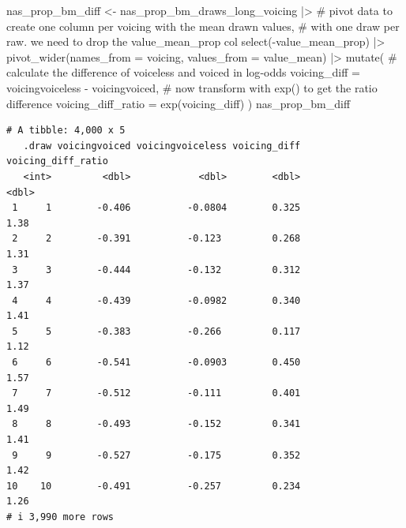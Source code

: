 \documentclass[
  authoryear,
  preprint,
  3p]{elsarticle}
\newenvironment{Shaded}{\begin{snugshade}}{\end{snugshade}}
\newcommand{\AttributeTok}[1]{\textcolor[rgb]{0.40,0.45,0.13}{#1}}
\newcommand{\CommentTok}[1]{\textcolor[rgb]{0.37,0.37,0.37}{#1}}
\newcommand{\FunctionTok}[1]{\textcolor[rgb]{0.28,0.35,0.67}{#1}}
\newcommand{\NormalTok}[1]{\textcolor[rgb]{0.00,0.23,0.31}{#1}}
\newcommand{\OtherTok}[1]{\textcolor[rgb]{0.00,0.23,0.31}{#1}}
\newcommand{\SpecialCharTok}[1]{\textcolor[rgb]{0.37,0.37,0.37}{#1}}
\begin{document}
\begin{Shaded}
\begin{Highlighting}[]
\NormalTok{nas\_prop\_bm\_diff }\OtherTok{\textless{}{-}}\NormalTok{ nas\_prop\_bm\_draws\_long\_voicing }\SpecialCharTok{|\textgreater{}} 
  \CommentTok{\# pivot data to create one column per voicing with the mean drawn values,}
  \CommentTok{\# with one draw per raw. we need to drop the value\_mean\_prop col}
  \FunctionTok{select}\NormalTok{(}\SpecialCharTok{{-}}\NormalTok{value\_mean\_prop) }\SpecialCharTok{|\textgreater{}} 
  \FunctionTok{pivot\_wider}\NormalTok{(}\AttributeTok{names\_from =}\NormalTok{ voicing, }\AttributeTok{values\_from =}\NormalTok{ value\_mean) }\SpecialCharTok{|\textgreater{}} 
  \FunctionTok{mutate}\NormalTok{(}
    \CommentTok{\# calculate the difference of voiceless and voiced in log{-}odds}
    \AttributeTok{voicing\_diff =}\NormalTok{ voicingvoiceless }\SpecialCharTok{{-}}\NormalTok{ voicingvoiced,}
    \CommentTok{\# now transform with exp() to get the ratio difference}
    \AttributeTok{voicing\_diff\_ratio =} \FunctionTok{exp}\NormalTok{(voicing\_diff)}
\NormalTok{  )}
\NormalTok{nas\_prop\_bm\_diff}
\end{Highlighting}
\end{Shaded}

\begin{verbatim}
# A tibble: 4,000 x 5
   .draw voicingvoiced voicingvoiceless voicing_diff voicing_diff_ratio
   <int>         <dbl>            <dbl>        <dbl>              <dbl>
 1     1        -0.406          -0.0804        0.325               1.38
 2     2        -0.391          -0.123         0.268               1.31
 3     3        -0.444          -0.132         0.312               1.37
 4     4        -0.439          -0.0982        0.340               1.41
 5     5        -0.383          -0.266         0.117               1.12
 6     6        -0.541          -0.0903        0.450               1.57
 7     7        -0.512          -0.111         0.401               1.49
 8     8        -0.493          -0.152         0.341               1.41
 9     9        -0.527          -0.175         0.352               1.42
10    10        -0.491          -0.257         0.234               1.26
# i 3,990 more rows
\end{verbatim}
\end{document}
